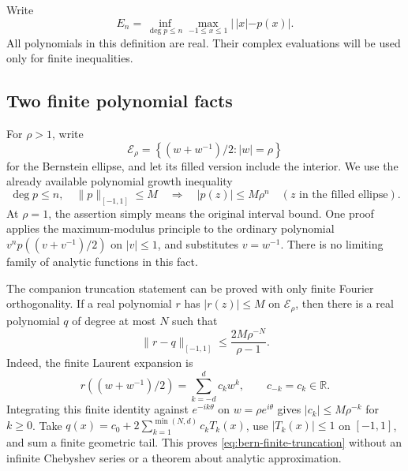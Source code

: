 \documentclass[11pt,a4paper]{article}
\theoremstyle{definition}
\newcommand{\R}{\mathbb R}
\begin{document}
Write
\[
 E_n=\inf_{\deg p\le n}\max_{-1\le x\le1}|\,|x|-p(x)|.
\]
All polynomials in this definition are real. Their complex evaluations
will be used only for finite inequalities.

\subsection{Two finite polynomial facts}
For $\rho>1$, write
\[
 \mathcal E_\rho=
 \left\{(w+w^{-1})/2:|w|=\rho\right\}
\]
for the Bernstein ellipse, and let its filled version include the interior.
We use the already available polynomial growth inequality
\begin{equation}
 \deg p\le n,\quad \|p\|_{[-1,1]}\le M
 \quad\Longrightarrow\quad
 |p(z)|\le M\rho^n\quad
 (z\text{ in the filled ellipse}).
 \label{eq:bern-finite-growth}
\end{equation}
At $\rho=1$, the assertion simply means the original interval bound.
One proof applies the maximum-modulus principle to the ordinary
polynomial $v^np((v+v^{-1})/2)$ on $|v|\le1$, and substitutes $v=w^{-1}$.
There is no limiting family of analytic functions in this fact.

The companion truncation statement can be proved with only finite Fourier
orthogonality. If a real polynomial $r$ has $|r(z)|\le M$ on
$\mathcal E_\rho$, then there is a real polynomial $q$ of degree at most $N$
such that
\begin{equation}
 \|r-q\|_{[-1,1]}\le
 \frac{2M\rho^{-N}}{\rho-1}.
 \label{eq:bern-finite-truncation}
\end{equation}
Indeed, the finite Laurent expansion is
\[
 r((w+w^{-1})/2)=\sum_{k=-d}^{d}c_kw^k,
 \qquad c_{-k}=c_k\in\R.
\]
Integrating this finite identity against $e^{-ik\theta}$ on
$w=\rho e^{i\theta}$ gives $|c_k|\le M\rho^{-k}$ for $k\ge0$.
Take
$q(x)=c_0+2\sum_{k=1}^{\min(N,d)}c_kT_k(x)$, use
$|T_k(x)|\le1$ on $[-1,1]$, and sum a finite geometric tail.
This proves \eqref{eq:bern-finite-truncation} without an infinite
Chebyshev series or a theorem about analytic approximation.
\end{document}
